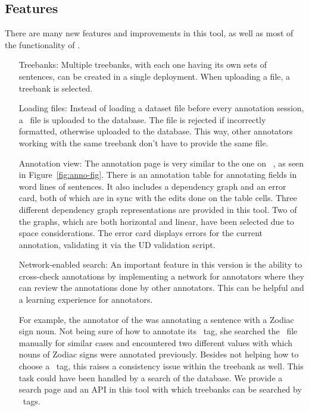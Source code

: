 \subsection{Features}
\label{sec:features}

There are many new features and improvements in this tool, as well as most of the functionality of \boatvone.

\begin{itemize}[before=\normalfont, font=\itshape, align=left]
    \item[Treebanks:]
        Multiple treebanks, with each one having its own sets of sentences, can be created in a single deployment.
        When uploading a file, a treebank is selected.

    \item[Loading files:]
        Instead of loading a dataset file before every annotation session, a \conllu\ file is uploaded to the database.
        The file is rejected if incorrectly formatted, otherwise uploaded to the database.
        This way, other annotators working with the same treebank don't have to provide the same file.

    \item[Annotation view:]
        The annotation page is very similar to the one on \boatvone~\cite{trk2020resources}, as seen in Figure~\ref{fig:anno-fig}.
        There is an annotation table for annotating fields in word lines of sentences.
        It also includes a dependency graph and an error card, both of which are in sync with the edits done on the table cells.
        Three different dependency graph representations are provided in this tool.
        Two of the graphs, which are both horizontal and linear, have been selected due to space considerations.
        The error card displays errors for the current annotation, validating it via the UD validation script.

    \item[Network-enabled search:]
        An important feature in this version is the ability to cross-check annotations by implementing a network for annotators where they can review the annotations done by other annotators.
        This can be helpful and a learning experience for annotators.

        For example, the annotator of the \bountreebank was annotating a sentence with a Zodiac sign noun.
        Not being sure of how to annotate its \upos\ tag, she searched the \conllu\ file manually for similar cases and encountered two different values with which nouns of Zodiac signs were annotated previously.
        Besides not helping how to choose a \upos\ tag, this raises a consistency issue within the treebank as well.
        This task could have been handled by a search of the database.
        We provide a search page and an API in this tool with which treebanks can be searched by \ud\ tags.


\end{itemize}
